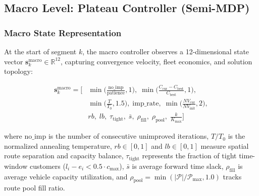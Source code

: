 \documentclass{ieeeaccess}
\begin{document}
\subsection{Macro Level: Plateau Controller (Semi-MDP)}
\label{sec:macro_controller}

\subsubsection{Macro State Representation}
At the start of segment $k$, the macro controller observes a 12-dimensional state vector $\mathbf{s}_k^{\text{macro}} \in \mathbb{R}^{12}$, capturing convergence velocity, fleet economics, and solution topology:

\begin{align}  \mathbf{s}_k^{\text{macro}} = \Big[ 
    &\min\Big(\frac{\text{no\_imp}}{\text{patience}}, 1\Big), \;
    \min\Big(\frac{C_{\text{cur}} - C_{\text{best}}}{C_{\text{best}}}, 1\Big), \nonumber \\
    &\min\Big(\frac{T}{T_0}, 1.5\Big), \;
    \text{imp\_rate}, \;
    \min\Big(\frac{NV_{\text{cur}}}{NV_{\text{init}}}, 2\Big), \nonumber \\
    &rb, \; lb, \; \tau_{\text{tight}}, \; \bar{s}, \; \rho_{\text{fill}}, \; \rho_{\text{pool}}, \; \frac{k}{K_{\max}}
  \Big]
  \label{eq:macro_state}
\end{align}

where $\text{no\_imp}$ is the number of consecutive unimproved iterations, $T/T_0$ is the normalized annealing temperature, $rb \in [0, 1]$ and $lb \in [0, 1]$ measure spatial route separation and capacity balance, $\tau_{\text{tight}}$ represents the fraction of tight time-window customers ($l_i - e_i < 0.5 \cdot c_{\max}$), $\bar{s}$ is average forward time slack, $\rho_{\text{fill}}$ is average vehicle capacity utilization, and $\rho_{\text{pool}} = \min(|\mathcal{P}|/\mathcal{P}_{\max}, 1.0)$ tracks route pool fill ratio.
\end{document}
